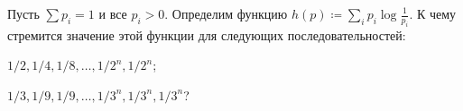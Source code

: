 Пусть $\sum p_i = 1$ и все $p_i > 0$. Определим функцию $h(p) \coloneqq
\sum\limits_{i} p_i \log \frac{1}{p_i}$.
К чему стремится значение этой функции для следующих последовательностей:
\begin{enumcyr}
    \item $1 / 2, 1 / 4, 1 / 8, \dots, 1 / 2^n, 1 / 2^n$;
    \item $1 / 3, 1 / 9, 1 / 9, \dots, 1 / 3^n, 1 / 3^n, 1 / 3^n$?
\end{enumcyr}